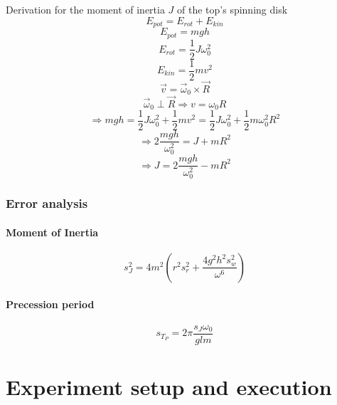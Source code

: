 \documentclass{scrreprt}
\begin{document}
Derivation for the moment of inertia $J$ of the top's spinning disk
\begin{equation}
	E_{pot}=E_{rot}+E_{kin}
\end{equation}
\begin{equation}
	E_{pot}=mgh
\end{equation}
\begin{equation}
	E_{rot}=\frac{1}{2}J\omega_0^2
\end{equation}
\begin{equation}
	E_{kin}=\frac{1}{2}mv^2
\end{equation}
\begin{equation}
	\vec{v}=\vec{\omega}_0\times\vec{R}
\end{equation}
\begin{equation}
	\vec{\omega}_0\perp\vec{R}\Rightarrow v=\omega_0R
\end{equation}
\begin{equation}
	\Rightarrow mgh=\frac{1}{2}J\omega_0^2+\frac{1}{2}mv^2=\frac{1}{2}J\omega_0^2+\frac{1}{2}m\omega_0^2R^2
\end{equation}
\begin{equation}
	\Rightarrow 2\frac{mgh}{\omega_0^2}=J+mR^2
\end{equation}
\begin{equation}
	\Rightarrow J=2\frac{mgh}{\omega_0^2}-mR^2
\end{equation}

\subsubsection{Error analysis}
\paragraph*{Moment of Inertia}

\begin{equation}
s_J^2 = 4 m^2 \left( r^2 s_r^2 + \frac{4 g^2 h^2 s_w^2}{\omega^6} \right)
\end{equation}

\paragraph*{Precession period}

\begin{equation}
s_{T_P} = 2 \pi \frac{s_J \omega_0}{g l m}
\end{equation}

\section{Experiment setup and execution}
\end{document}
